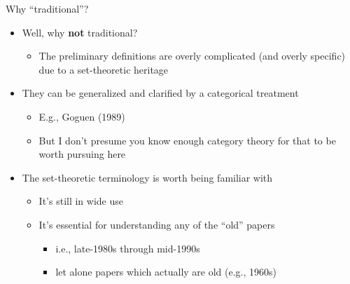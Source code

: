 \documentclass[pdf,fyma2]{prosper} %
\renewcommand{\emph}[1]{\textbf{#1}}
\begin{document}
\begin{slide}{Why ``traditional''?}
	\vspace{1em}
	\begin{itemize}
	\item Well, why \emph{not} traditional?
        \begin{itemize}
	    \item The preliminary definitions are overly complicated (and overly specific) due to a set-theoretic heritage
        \end{itemize}
	\vspace{1em}
	\item They can be generalized and clarified by a categorical treatment
        \begin{itemize}
        \item E.g., Goguen (1989)
        \item But I don't presume you know enough category theory for that to be worth pursuing here
        \end{itemize}
	\vspace{1em}
    \item The set-theoretic terminology is worth being familiar with
        \begin{itemize}
        \item It's still in wide use
        \item It's essential for understanding any of the ``old'' papers
            \begin{itemize}
            \item i.e., late-1980s through mid-1990s
            \item let alone papers which actually are old (e.g., 1960s)
            \end{itemize}
        \end{itemize}
	\end{itemize}
\end{slide}
\end{document}

